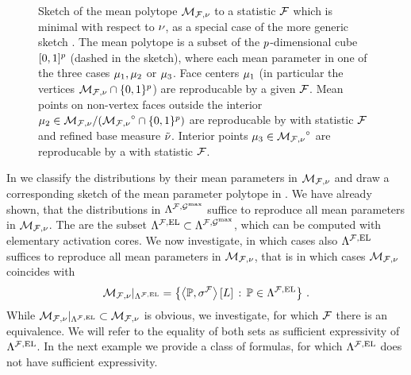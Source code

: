 \begin{figure}[t]
    \begin{center}
        
    \end{center}
    \caption{Sketch of the mean polytope ${\mathcal{M}_{\mathcal{F},\nu}}$ to a statistic $\mathcal{F}$ which is minimal with respect to $\nu$, as a special case of the more generic sketch .
    The mean polytope is a subset of the $p$-dimensional cube $[0,1]^{p}$ (dashed in the sketch), where each mean parameter in one of the three cases $\mu_{1},\mu_{2}$ or $\mu_{3}$.
    \textcolor{\concolor}{Face centers} $\mu_{1}$ (in particular the vertices $\mathcal{M}_{\mathcal{F},\nu}\cap\{0,1\}^{p}$) are reproducable by a \HardLogicNetwork{} given $\mathcal{F}$.
    Mean points on non-vertex faces outside the interior $\mu_{2}\in\mathcal{M}_{\mathcal{F},\nu}/({\mathcal{M}_{\mathcal{F},\nu}}^{\circ}\cap\{0,1\}^{p})$ are reproducable by \HybridLogicNetworks{} with statistic $\mathcal{F}$ and refined base measure $\tilde{\nu}$.
    \textcolor{\probcolor}{Interior points} $\mu_{3}\in{\mathcal{M}_{\mathcal{F},\nu}}^{\circ}$ are reproducable by a \MarkovLogicNetwork{} with statistic $\mathcal{F}$.
    }\label{fig:meansetSketch}
\end{figure}

In  we classify the distributions by their mean parameters in $\mathcal{M}_{\mathcal{F},\nu}$ and draw a corresponding sketch of the mean parameter polytope in .
We have already shown, that the distributions in $\Lambda^{\mathcal{F},\mathcal{G}^{\mathrm{max}}}$ suffice to reproduce all mean parameters in $\mathcal{M}_{\mathcal{F},\nu}$.
The \HybridLogicNetworks{} are the subset $\Lambda^{\mathcal{F},\mathrm{EL}}\subset\Lambda^{\mathcal{F},\mathcal{G}^{\mathrm{max}}}$, which can be computed with elementary activation cores.
We now investigate, in which cases also $\Lambda^{\mathcal{F},\mathrm{EL}}$ suffices to reproduce all mean parameters in $\mathcal{M}_{\mathcal{F},\nu}$, that is in which cases $\mathcal{M}_{\mathcal{F},\nu}$ coincides with
\begin{align*}
    \mathcal{M}_{\mathcal{F},\nu}|_{\Lambda^{\mathcal{F},\mathrm{EL}}}
    = \left\{ \left\langle \mathbb{P},\sigma^{\mathcal{F}}\right\rangle \left[ L \right] \,:\, \mathbb{P}\in\Lambda^{\mathcal{F},\mathrm{EL}} \right\} \, .
\end{align*}
While $\mathcal{M}_{\mathcal{F},\nu}|_{\Lambda^{\mathcal{F},\mathrm{EL}}}\subset\mathcal{M}_{\mathcal{F},\nu}$ is obvious, we investigate, for which $\mathcal{F}$ there is an equivalence.
We will refer to the equality of both sets as sufficient expressivity of $\Lambda^{\mathcal{F},\mathrm{EL}}$.
In the next example we provide a class of formulas, for which $\Lambda^{\mathcal{F},\mathrm{EL}}$ does not have sufficient expressivity.

